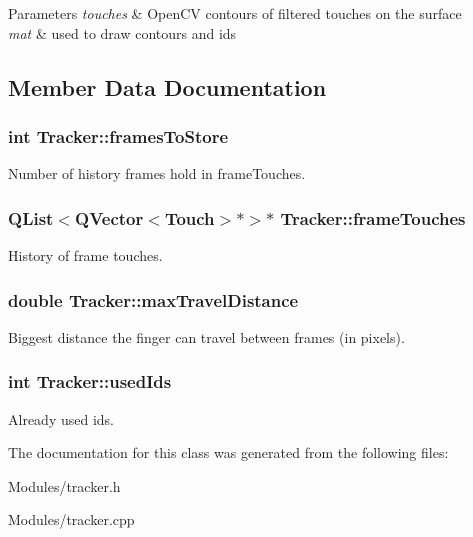 \begin{DoxyParams}{Parameters}
{\em touches} & OpenCV contours of filtered touches on the surface \\
\hline
{\em mat} & used to draw contours and ids \\
\hline
\end{DoxyParams}


\subsection{Member Data Documentation}
\hypertarget{class_tracker_a601db61af5b01acaa4b73f13013e52f0}{
\subsubsection[{framesToStore}]{\setlength{\rightskip}{0pt plus 5cm}int {\bf Tracker::framesToStore}}}
\label{de/dbb/class_tracker_a601db61af5b01acaa4b73f13013e52f0}
Number of history frames hold in frameTouches. \hypertarget{class_tracker_a702ac376de188e180cd5a8111cf92752}{
\subsubsection[{frameTouches}]{\setlength{\rightskip}{0pt plus 5cm}QList$<$QVector$<${\bf Touch}$>$$\ast$$>$$\ast$ {\bf Tracker::frameTouches}}}
\label{de/dbb/class_tracker_a702ac376de188e180cd5a8111cf92752}
History of frame touches. \hypertarget{class_tracker_a31fcaab957d7fcb34fb32797128f14b4}{
\subsubsection[{maxTravelDistance}]{\setlength{\rightskip}{0pt plus 5cm}double {\bf Tracker::maxTravelDistance}}}
\label{de/dbb/class_tracker_a31fcaab957d7fcb34fb32797128f14b4}
Biggest distance the finger can travel between frames (in pixels). \hypertarget{class_tracker_afd3b08a68c5e668917f949282dbe9068}{
\subsubsection[{usedIds}]{\setlength{\rightskip}{0pt plus 5cm}int {\bf Tracker::usedIds}}}
\label{de/dbb/class_tracker_afd3b08a68c5e668917f949282dbe9068}
Already used ids. 

The documentation for this class was generated from the following files:\begin{DoxyCompactItemize}
\item 
Modules/tracker.h\item 
Modules/tracker.cpp\end{DoxyCompactItemize}
